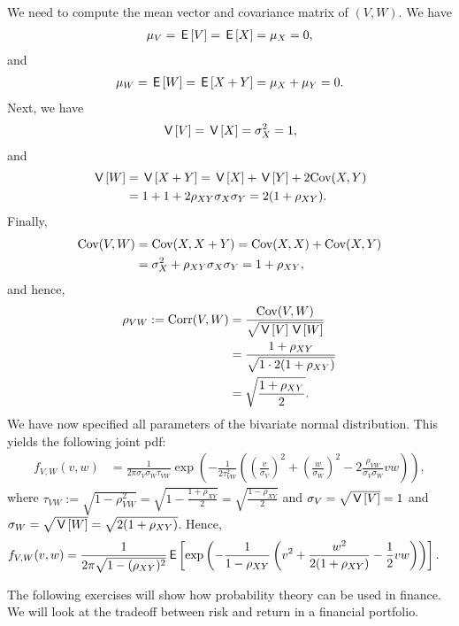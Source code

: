 \begin{exercise}
\begin{solution}
We need to compute the mean vector and covariance matrix of $(V,W)$. We have
\begin{align}
    \mu_V = \,\mathsf{E}\left[V\right] = \,\mathsf{E}\left[X\right] = \mu_X = 0,
\end{align}
and
\begin{align}
    \mu_W = \,\mathsf{E}\left[W\right] = \,\mathsf{E}\left[X + Y\right] = \mu_X + \mu_Y = 0.
\end{align}
Next, we have
\begin{align}
    \,\mathsf{V}\left[V\right] = \,\mathsf{V}\left[X\right] = \sigma_X^2 = 1,
\end{align}
and
\begin{align}
    \,\mathsf{V}\left[W\right] &= \,\mathsf{V}\left[X + Y\right] = \,\mathsf{V}\left[X\right] + \,\mathsf{V}\left[Y\right] + 2\text{Cov}(X,Y)\\
    &= 1 + 1 + 2 \rho_{XY} \sigma_X \sigma_Y = 2(1 + \rho_{XY}).
\end{align}
Finally,
\begin{align}
    \text{Cov}(V,W) &= \text{Cov}(X, X + Y) = \text{Cov}(X, X) + \text{Cov}(X, Y) \\
    &= \sigma_X^2 + \rho_{XY} \sigma_X \sigma_Y = 1 + \rho_{XY},
\end{align}
and hence,
\begin{align}
    \rho_{VW} := \text{Corr}(V,W) &= \frac{\text{Cov}(V,W)}{\sqrt{\,\mathsf{V}\left[V\right]\,\mathsf{V}\left[W\right]}} \\
    &= \frac{1 + \rho_{XY}}{\sqrt{1 \cdot 2(1 + \rho_{XY})}} \\
    &= \sqrt{\frac{1 + \rho_{XY}}{2}}.
\end{align}
We have now specified all parameters of the bivariate normal distribution. This yields the following joint pdf:
\begin{align}
    f_{V,W}(v,w) &= \frac{1}{2\pi \sigma_V \sigma_W \tau_{VW}} \exp\left(-\frac{1}{2 \tau_{VW}^2}\left(\left(\frac{v}{\sigma_V}\right)^2 + \left(\frac{w}{\sigma_W}\right)^2 - 2 \frac{\rho_{VW}}{\sigma_V \sigma_W} vw\right) \right),
\end{align}
where $\tau_{VW} := \sqrt{1 - \rho_{VW}^2} = \sqrt{1 - \frac{1 + \rho_{XY}}{2}} = \sqrt{\frac{1 - \rho_{XY}}{2}}$ and $\sigma_V = \sqrt{\,\mathsf{V}\left[V\right]} = 1$ and $\sigma_W = \sqrt{\,\mathsf{V}\left[W\right]} = \sqrt{2(1 + \rho_{XY})}$. Hence,
\begin{align}
    f_{V,W}(v,w) &= \frac{1}{2\pi \sqrt{1 - (\rho_{XY})^2}} \,\mathsf{E}\left[\exp\left(-\frac{1}{1 - \rho_{XY}}\left(v^2 + \frac{w^2}{2(1 + \rho_{XY})}- \frac12 vw\right)\right)\right].
\end{align}

\end{solution}
\end{exercise}


The following exercises will show how probability theory can be used in finance. We will look at the tradeoff between risk and return in a financial portfolio.

